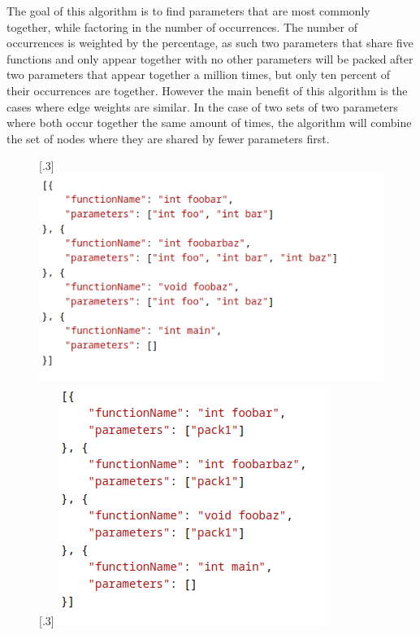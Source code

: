 \documentclass{article}
\begin{document}
The goal of this algorithm is to find parameters that are most commonly together, while factoring in the number of occurrences. The number of occurrences is weighted by the percentage, as such two parameters that share five functions and only appear together with no other parameters will be packed after two parameters that appear together a million times, but only ten percent of their occurrences are together. However the main benefit of this algorithm is the cases where edge weights are similar. In the case of two sets of two parameters where both occur together the same amount of times, the algorithm will combine the set of nodes where they are shared by fewer parameters first.

\begin{figure}[ht]
    
    [.3\linewidth]{%
        \includegraphics[width=\linewidth]{im3.png}%
      }
    \hfill
    [.3\linewidth]{%
        \includegraphics[width=\linewidth]{im4.png}%
}
\end{figure}
\end{document}
